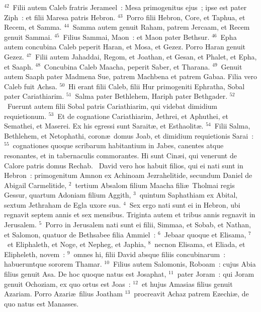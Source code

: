 ${}^{42}$~Filii autem Caleb fratris Jerameel~: Mesa primogenitus ejus~; ipse est pater Ziph~: et filii Maresa patris Hebron.
${}^{43}$~Porro filii Hebron, Core, et Taphua, et Recem, et Samma.
${}^{44}$~Samma autem genuit Raham, patrem Jercaam, et Recem genuit Sammai.
${}^{45}$~Filius Sammai, Maon~: et Maon pater Bethsur.
${}^{46}$~Epha autem concubina Caleb peperit Haran, et Mosa, et Gezez. Porro Haran genuit Gezez.
${}^{47}$~Filii autem Jahaddai, Regom, et Joathan, et Gesan, et Phalet, et Epha, et Saaph.
${}^{48}$~Concubina Caleb Maacha, peperit Saber, et Tharana.
${}^{49}$~Genuit autem Saaph pater Madmena Sue, patrem Machbena et patrem Gabaa. Filia vero Caleb fuit Achsa.
${}^{50}$~Hi erant filii Caleb, filii Hur primogeniti Ephratha, Sobal pater Cariathiarim.
${}^{51}$~Salma pater Bethlehem, Hariph pater Bethgader.
${}^{52}$~Fuerunt autem filii Sobal patris Cariathiarim, qui videbat dimidium requietionum.
${}^{53}$~Et de cognatione Cariathiarim, Jethrei, et Aphuthei, et Semathei, et Maserei. Ex his egressi sunt Sarait\ae , et Esthaolit\ae .
${}^{54}$~Filii Salma, Bethlehem, et Netophathi, coron\ae\ domus Joab, et dimidium requietionis Sarai~:
${}^{55}$~cognationes quoque scribarum habitantium in Jabes, canentes atque resonantes, et in tabernaculis commorantes. Hi sunt Cin\ae i, qui venerunt de Calore patris domus Rechab.
~\lettrine[lines=10,image=true,loversize=0.05,lraise=-0.03]{D}{}avid vero hos habuit filios, qui ei nati sunt in Hebron~: primogenitum Amnon ex Achinoam Jezrahelitide, secundum Daniel de Abigail Carmelitide,
${}^{2}$~tertium Absalom filium Maacha fili\ae\ Tholmai regis Gessur, quartum Adoniam filium Aggith,
${}^{3}$~quintum Saphathiam ex Abital, sextum Jethraham de Egla uxore sua.
${}^{4}$~Sex ergo nati sunt ei in Hebron, ubi regnavit septem annis et sex mensibus. Triginta autem et tribus annis regnavit in Jerusalem.
${}^{5}$~Porro in Jerusalem nati sunt ei filii, Simmaa, et Sobab, et Nathan, et Salomon, quatuor de Bethsabee filia Ammiel~:
${}^{6}$~Jebaar quoque et Elisama,
${}^{7}$~et Eliphaleth, et Noge, et Nepheg, et Japhia,
${}^{8}$~necnon Elisama, et Eliada, et Elipheleth, novem~:
${}^{9}$~omnes hi, filii David absque filiis concubinarum~: habueruntque sororem Thamar.
${}^{10}$~Filius autem Salomonis, Roboam~: cujus Abia filius genuit Asa. De hoc quoque natus est Josaphat,
${}^{11}$~pater Joram~: qui Joram genuit Ochoziam, ex quo ortus est Joas~:
${}^{12}$~et hujus Amasias filius genuit Azariam. Porro Azari\ae\ filius Joatham
${}^{13}$~procreavit Achaz patrem Ezechi\ae , de quo natus est Manasses.
